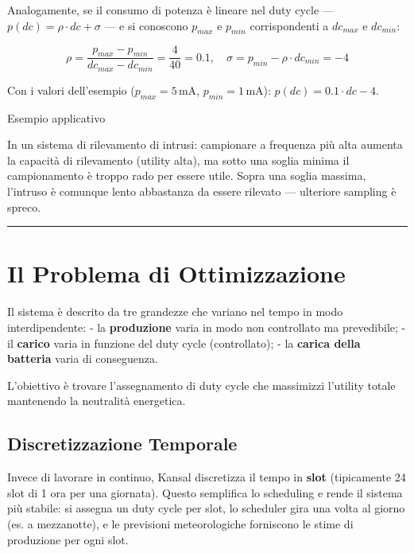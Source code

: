 \documentclass[
  italian,
  openany]{book}
\begin{document}
Analogamente, se il consumo di potenza è lineare nel duty cycle ---
\(p(dc) = \rho \cdot dc + \sigma\) --- e si conoscono \(p_{max}\) e
\(p_{min}\) corrispondenti a \(dc_{max}\) e \(dc_{min}\):

\[
\rho = \frac{p_{max} - p_{min}}{dc_{max} - dc_{min}} = \frac{4}{40} = 0.1, \quad \sigma = p_{min} - \rho \cdot dc_{min} = -4
\]

Con i valori dell'esempio (\(p_{max} = 5\,\text{mA}\),
\(p_{min} = 1\,\text{mA}\)): \(p(dc) = 0.1 \cdot dc - 4\).

\begin{callouttip}{Esempio applicativo}

In un sistema di rilevamento di intrusi: campionare a frequenza più alta
aumenta la capacità di rilevamento (utility alta), ma sotto una soglia
minima il campionamento è troppo rado per essere utile. Sopra una soglia
massima, l'intruso è comunque lento abbastanza da essere rilevato ---
ulteriore sampling è spreco.

\end{callouttip}

\begin{center}\rule{0.5\linewidth}{0.5pt}\end{center}

\section{Il Problema di
Ottimizzazione}\label{il-problema-di-ottimizzazione}

Il sistema è descrito da tre grandezze che variano nel tempo in modo
interdipendente: - la \textbf{produzione} varia in modo non controllato
ma prevedibile; - il \textbf{carico} varia in funzione del duty cycle
(controllato); - la \textbf{carica della batteria} varia di conseguenza.

L'obiettivo è trovare l'assegnamento di duty cycle che massimizzi
l'utility totale mantenendo la neutralità energetica.

\subsection{Discretizzazione
Temporale}\label{discretizzazione-temporale}

Invece di lavorare in continuo, Kansal discretizza il tempo in
\textbf{slot} (tipicamente 24 slot di 1 ora per una giornata). Questo
semplifica lo scheduling e rende il sistema più stabile: si assegna un
duty cycle per slot, lo scheduler gira una volta al giorno (es. a
mezzanotte), e le previsioni meteorologiche forniscono le stime di
produzione per ogni slot.
\end{document}
